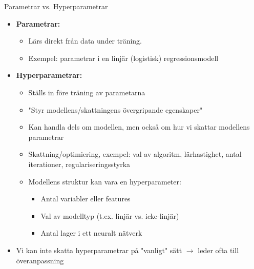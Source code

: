 \documentclass[10pt,english]{beamer}
\begin{document}
\begin{frame}{Parametrar vs. Hyperparametrar}
  \begin{itemize}
    \item \textbf{Parametrar:}
    \begin{itemize}
      \item Lärs direkt från data under träning.
      \item Exempel: parametrar i en linjär (logistisk) regressionsmodell
    \end{itemize}
    \item \textbf{Hyperparametrar:}
    \begin{itemize}
      \item Ställs in före träning av parametarna
      \item "Styr modellens/skattningens övergripande egenskaper"
      \item Kan handla dels om modellen, men också om hur vi skattar modellens parametrar
      \item Skattning/optimiering, exempel: val av algoritm, lärhastighet, antal iterationer, regulariseringsstyrka
      \item Modellens struktur kan vara en hyperparameter:
      \begin{itemize}
        \item Antal variabler eller features
        \item Val av modelltyp (t.ex. linjär vs. icke-linjär)
        \item Antal lager i ett neuralt nätverk
      \end{itemize}
    \end{itemize}
    \item Vi kan inte skatta hyperparametrar på "vanligt" sätt $\rightarrow$ leder ofta till överanpassning
  \end{itemize}
\end{frame}
\end{document}
